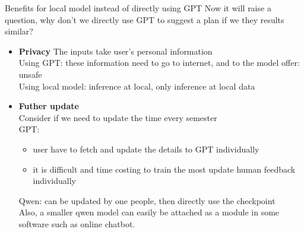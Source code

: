 \documentclass[aspectratio=169,11pt]{beamer}
\begin{document}
\begin{frame}{Benefits for local model instead of directly using GPT}
Now it will raise a question, why don't we directly use GPT to suggest a plan if we they results similar?\\
\begin{itemize}\setlength{\itemsep}{5pt}
\item \textbf{Privacy} The inputs take user's personal information\\
Using GPT: these information need to go to internet, and to the model offer: unsafe\\
Using local model: inference at local, only inference at local data
\item \textbf{Futher update}\\ Consider if we need to update the time every semester\\
GPT:\begin{itemize}\setlength{\itemsep}{5pt}
\item user have to fetch and update the details to GPT individually
\item it is difficult and time costing to train the most update human feedback individually
\end{itemize}
Qwen: can be updated by one people, then directly use the checkpoint\\
Also, a smaller qwen model can easily be attached as a module in some software such as online chatbot.\\


\end{itemize}

\end{frame}

\end{document}
